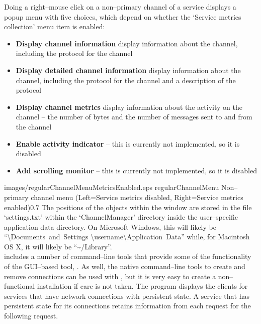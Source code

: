 Doing a right--mouse click on a non--primary channel of a service displays a popup menu
with five choices, which depend on whether the `Service metrics collection' menu item is
enabled:
\begin{itemize}
\item \textbf{Display channel information} display information about the channel,
including the protocol for the channel
\item \textbf{Display detailed channel information} display information about the channel,
including the protocol for the channel and a description of the protocol
\item \textbf{Display channel metrics} display information about the activity on the
channel -- the number of bytes and the number of messages sent to and from the channel
\item \textbf{Enable activity indicator} -- this is currently not implemented, so it is
disabled
\item \textbf{Add scrolling monitor} -- this is currently not implemented, so it is
disabled
\end{itemize}
%
{images/regularChannelMenuMetricsEnabled.eps}%
{regularChannelMenu}%
{Non--primary channel menu (Left=Service metrics disabled, Right=Service metrics enabled)}{0.7}
\clearpage
The positions of the objects within the window are stored in the file `settings.txt'
within the `ChannelManager' directory inside the user--specific application data
directory.
On Microsoft Windows, this will likely be ``\textbackslash{}Documents~and~Settings%
\textbackslash{}username\textbackslash{}Application~Data'' while, for Macintosh OS X, it
will likely be ``\textasciitilde/Library''.\\
\secondaryEnd{}
\newpage
{}
\mplusm{} includes a number of command--line tools that provide some of the functionality
of the GUI--based tool, .
As well, the native \yarp{} command--line tools to create and remove connections can be
used with \mplusm{}, but it is very easy to create a non--functional installation if care
is not taken.
The program  displays the clients for services that have
\yarp{} network connections with persistent state.
A service that has persistent state for its connections retains information from each
request for the following request.
